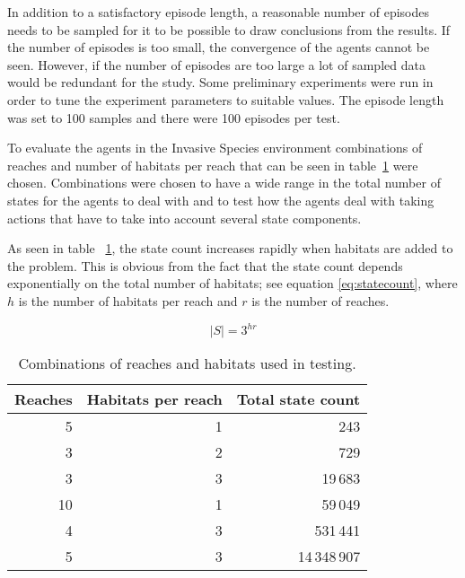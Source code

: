 In addition to a satisfactory episode length, a reasonable number of episodes
needs to be sampled for it to be possible to draw conclusions from the results.
If the number of episodes is too small, the convergence of the agents cannot be
seen. However, if the number of episodes are too large a lot of sampled data
would be redundant for the study. Some preliminary experiments were run in
order to tune the experiment parameters to suitable values. The episode length
was set to 100 samples and there were 100 episodes per test.

To evaluate the agents in the Invasive Species environment combinations of
reaches and number of habitats per reach that can be seen in
table~\ref{tab:reaches_habitats} were chosen. Combinations were chosen to have
a wide range in the total number of states for the agents to deal with and to
test how the agents deal with taking actions that have to take into account
several state components. 

As seen in table ~\ref{tab:reaches_habitats}, the state count increases rapidly
when habitats are added to the problem. This is obvious from the fact that the state count
depends exponentially on the total number of habitats; see equation \eqref{eq:statecount}, where $h$ is the number of habitats per reach and $r$ is the number of reaches.

\begin{equation}
\label{eq:statecount}
 |S| = 3 ^ {hr}
\end{equation}

\begin{table}[H]
\centering
\caption{Combinations of reaches and habitats used in testing.}
\label{tab:reaches_habitats}
\begin{tabular}{rrr}
 \toprule
 Reaches & Habitats per reach & Total state count \\
 \midrule
 5  & 1 &          243 \\
 3  & 2 &          729 \\
 3  & 3 &      19\,683 \\
 10 & 1 &      59\,049 \\
 4  & 3 &     531\,441 \\
 5  & 3 & 14\,348\,907 \\
 \bottomrule
\end{tabular}
\end{table}
